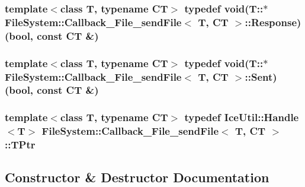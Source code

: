 \subsubsection[{Response}]{\setlength{\rightskip}{0pt plus 5cm}template$<$class T, typename C\+T$>$ typedef void(T\+::$\ast$ {\bf File\+System\+::\+Callback\+\_\+\+File\+\_\+send\+File}$<$ T, C\+T $>$\+::Response) (bool, const C\+T \&)}\label{class_file_system_1_1_callback___file__send_file_a3d604d3396d90e28e0f498d66e31e906}
\hypertarget{class_file_system_1_1_callback___file__send_file_ac3926735f3de742485a01c7e0e08dd2d}{}
\subsubsection[{Sent}]{\setlength{\rightskip}{0pt plus 5cm}template$<$class T, typename C\+T$>$ typedef void(T\+::$\ast$ {\bf File\+System\+::\+Callback\+\_\+\+File\+\_\+send\+File}$<$ T, C\+T $>$\+::Sent) (bool, const C\+T \&)}\label{class_file_system_1_1_callback___file__send_file_ac3926735f3de742485a01c7e0e08dd2d}
\hypertarget{class_file_system_1_1_callback___file__send_file_a666a8ba5af39dac36fdcb52b0916e2b9}{}
\subsubsection[{T\+Ptr}]{\setlength{\rightskip}{0pt plus 5cm}template$<$class T, typename C\+T$>$ typedef Ice\+Util\+::\+Handle$<$T$>$ {\bf File\+System\+::\+Callback\+\_\+\+File\+\_\+send\+File}$<$ T, C\+T $>$\+::{\bf T\+Ptr}}\label{class_file_system_1_1_callback___file__send_file_a666a8ba5af39dac36fdcb52b0916e2b9}


\subsection{Constructor \& Destructor Documentation}
\hypertarget{class_file_system_1_1_callback___file__send_file_a5dfd7d4e2727b7b8be3f1aab6b57124a}{}
